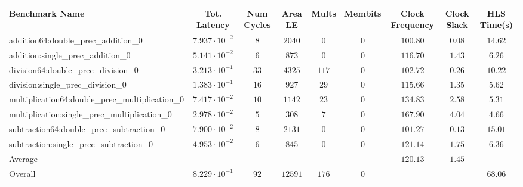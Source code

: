 \begin{tabular}{|l|c|c|c|c|c|c|c|c|}
\hline
Benchmark Name                                   & Tot. Latency            & Num Cycles & Area LE   & Mults   & Membits & Clock Frequency & Clock Slack & HLS Time(s) \\
\hline
addition64:double\_prec\_addition\_0             & $ 7.937 \cdot 10^{-2} $ & $ 8      $ & $ 2040  $ & $ 0   $ & $ 0   $ & $ 100.80      $ & $ 0.08    $ & $ 14.62   $ \\
addition:single\_prec\_addition\_0               & $ 5.141 \cdot 10^{-2} $ & $ 6      $ & $ 873   $ & $ 0   $ & $ 0   $ & $ 116.70      $ & $ 1.43    $ & $ 6.26    $ \\
division64:double\_prec\_division\_0             & $ 3.213 \cdot 10^{-1} $ & $ 33     $ & $ 4325  $ & $ 117 $ & $ 0   $ & $ 102.72      $ & $ 0.26    $ & $ 10.22   $ \\
division:single\_prec\_division\_0               & $ 1.383 \cdot 10^{-1} $ & $ 16     $ & $ 927   $ & $ 29  $ & $ 0   $ & $ 115.66      $ & $ 1.35    $ & $ 5.62    $ \\
multiplication64:double\_prec\_multiplication\_0 & $ 7.417 \cdot 10^{-2} $ & $ 10     $ & $ 1142  $ & $ 23  $ & $ 0   $ & $ 134.83      $ & $ 2.58    $ & $ 5.31    $ \\
multiplication:single\_prec\_multiplication\_0   & $ 2.978 \cdot 10^{-2} $ & $ 5      $ & $ 308   $ & $ 7   $ & $ 0   $ & $ 167.90      $ & $ 4.04    $ & $ 4.66    $ \\
subtraction64:double\_prec\_subtraction\_0       & $ 7.900 \cdot 10^{-2} $ & $ 8      $ & $ 2131  $ & $ 0   $ & $ 0   $ & $ 101.27      $ & $ 0.13    $ & $ 15.01   $ \\
subtraction:single\_prec\_subtraction\_0         & $ 4.953 \cdot 10^{-2} $ & $ 6      $ & $ 845   $ & $ 0   $ & $ 0   $ & $ 121.14      $ & $ 1.75    $ & $ 6.36    $ \\
\hline
Average                                          & $                     $ & $        $ & $       $ & $     $ & $     $ & $ 120.13      $ & $ 1.45    $ & $         $ \\
\hline
Overall                                          & $ 8.229 \cdot 10^{-1} $ & $ 92     $ & $ 12591 $ & $ 176 $ & $ 0   $ & $             $ & $         $ & $ 68.06   $ \\
\hline
\end{tabular}
